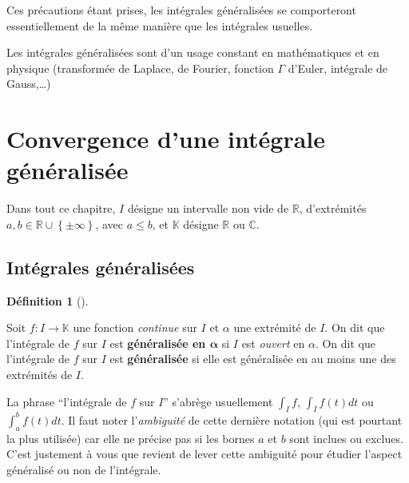 \documentclass[
  french,
  letterpaper,
  DIV=11,
  numbers=noendperiod]{scrreprt}
\theoremstyle{plain}
\theoremstyle{definition}
\newtheorem{definition}{Définition}[chapter]
\theoremstyle{plain}
\theoremstyle{plain}
\theoremstyle{definition}
\theoremstyle{definition}
\theoremstyle{plain}
\theoremstyle{remark}
\newcounter{quartocalloutnteno}
\newcommand{\quartocalloutnte}[1]{\refstepcounter{quartocalloutnteno}\label{#1}}
\begin{document}
Ces précautions étant prises, les intégrales généralisées se
comporteront essentiellement de la même manière que les intégrales
usuelles.

Les intégrales généralisées sont d'un usage constant en mathématiques et
en physique (transformée de Laplace, de Fourier, fonction \(\Gamma\)
d'Euler, intégrale de Gauss,\ldots)

\section{Convergence d'une intégrale
généralisée}\label{sec-01-convergence}

Dans tout ce chapitre, \(I\) désigne un intervalle non vide de
\(\mathbb{R}\), d'extrémités
\(a,b \in \mathbb{R}\cup \left\{ \pm \infty\right\}\), avec \(a
\leqslant b\), et \(\mathbb{K}\) désigne \(\mathbb{R}\) ou
\(\mathbb{C}\).

\subsection{Intégrales
généralisées}\label{intuxe9grales-guxe9nuxe9ralisuxe9es-1}

\begin{definition}[]\protect\hypertarget{def-integrale-generalisee}{}\label{def-integrale-generalisee}

Soit \(f:I \to \mathbb{K}\) une fonction \emph{continue} sur \(I\) et
\(\alpha\) une extrémité de \(I\). On dit que l'intégrale de \(f\) sur
\(I\) est \textbf{généralisée en \(\boldsymbol{\alpha}\)} si \(I\) est
\emph{ouvert} en \(\alpha\). On dit que l'intégrale de \(f\) sur \(I\)
est \textbf{généralisée} si elle est généralisée en au moins une des
extrémités de \(I\).

\end{definition}

\begin{tcolorbox}[enhanced jigsaw, arc=.35mm, bottomrule=.15mm, bottomtitle=1mm, breakable, colback=white, colbacktitle=quarto-callout-note-color!10!white, colframe=quarto-callout-note-color-frame, coltitle=black, left=2mm, leftrule=.75mm, opacityback=0, opacitybacktitle=0.6, rightrule=.15mm, title=\textcolor{quarto-callout-note-color}{\faInfo}\hspace{0.5em}{Note \ref*{nte-ambiguite}}, titlerule=0mm, toprule=.15mm, toptitle=1mm]

\quartocalloutnte{nte-ambiguite} 

La phrase ``l'intégrale de \(f\) sur \(I\)'' s'abrège usuellement
\(\int_{I}f\), \(\int_{I}f(t)dt\) ou \(\int_{a}^{b}f(t)dt\). Il faut
noter l'\emph{ambiguité} de cette dernière notation (qui est pourtant la
plus utilisée) car elle ne précise pas si les bornes \(a\) et \(b\) sont
inclues ou exclues. C'est justement à vous que revient de lever cette
ambiguité pour étudier l'aspect généralisé ou non de l'intégrale.

\end{tcolorbox}
\end{document}
